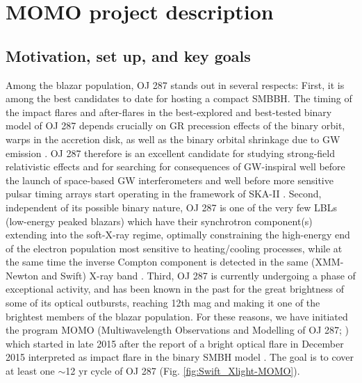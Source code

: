 \documentclass[preprints,article,accept,moreauthors,pdftex]{Definitions/mdpi}
\begin{document}
\section{MOMO project description}


\subsection{Motivation, set up, and key goals}

Among the blazar population, OJ 287 stands out in several respects: First, it is among the best candidates to date for hosting a compact SMBBH. 
The timing of the impact flares and after-flares in the best-explored and best-tested binary model of OJ 287 depends crucially on GR precession effects of the binary orbit, warps in the accretion disk,
as well as the binary orbital shrinkage due to GW emission \citep{Valtonen2008, Valtonen2016, Dey2018, Laine2020}. OJ 287 therefore is an excellent candidate for studying strong-field relativistic effects and for searching for consequences of GW-inspiral well before the launch of space-based GW interferometers and well before more sensitive pulsar timing arrays
start operating in the framework of SKA-II \citep{Yardley2010}. 
Second, independent of its possible binary nature, OJ 287 is one of the very few LBLs (low-energy peaked blazars) which have their synchrotron component(s) extending into the soft-X-ray regime, optimally constraining the high-energy end of the electron population most sensitive to heating/cooling processes, while at the same time the inverse Compton component is detected in the same (XMM-Newton and Swift) X-ray band \citep{Komossa2021a}. Third, OJ 287 is currently undergoing a phase of exceptional activity,
and has been known in the past for the great brightness of some of its optical outbursts, reaching 12th mag and making it one of the brightest members of the blazar population.   
For these reasons, we have initiated the program MOMO (Multiwavelength Observations and Modelling of OJ 287; \citep[e.g.][]{Komossa2017,Komossa2021a}) which started in late 2015 after the report of a bright optical flare in December 2015 interpreted as impact flare in the binary SMBH model \citep{Valtonen2016}.
The goal is to cover at least one $\sim$12 yr cycle of OJ 287 (Fig. \ref{fig:Swift_Xlight-MOMO}). 
\end{document}
